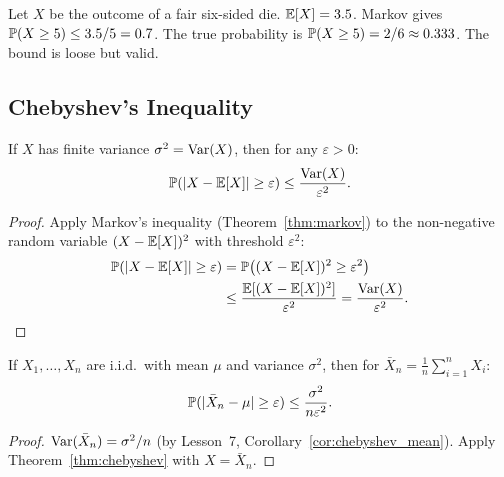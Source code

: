 \documentclass[11pt,a4paper]{article}
\begin{document}
\begin{example}
\label{ex:markov_die}
Let $X$ be the outcome of a fair six-sided die.
$\mathbb{E}[X] = 3.5$.  Markov gives
$\mathbb{P}(X \geq 5) \leq 3.5/5 = 0.7$.  The true probability is
$\mathbb{P}(X \geq 5) = 2/6 \approx 0.333$.  The bound is loose but
valid.
\end{example}

\subsection{Chebyshev's Inequality}
\label{subsec:chebyshev}

\begin{keyresult}[title={Chebyshev's Inequality}]
\begin{theorem}
\label{thm:chebyshev}
If $X$ has finite variance $\sigma^2 = \operatorname{Var}(X)$, then for any
$\varepsilon > 0$:
\begin{equation}
  \mathbb{P}(|X - \mathbb{E}[X]| \geq \varepsilon)
  \leq \frac{\operatorname{Var}(X)}{\varepsilon^2}.
  \label{eq:chebyshev}
\end{equation}
\end{theorem}
\end{keyresult}

\begin{proof}
Apply Markov's inequality (Theorem~\ref{thm:markov}) to the
non-negative random variable $(X - \mathbb{E}[X])^2$ with threshold
$\varepsilon^2$:
\begin{align}
  \mathbb{P}(|X - \mathbb{E}[X]| \geq \varepsilon)
  &= \mathbb{P}\!\left((X - \mathbb{E}[X])^2 \geq \varepsilon^2\right)
  \nonumber\\
  &\leq \frac{\mathbb{E}[(X - \mathbb{E}[X])^2]}{\varepsilon^2}
  = \frac{\operatorname{Var}(X)}{\varepsilon^2}. \qedhere
  \label{eq:chebyshev_proof}
\end{align}
\end{proof}

\begin{corollary}
\label{cor:chebyshev_mean}
If $X_1, \ldots, X_n$ are i.i.d.\ with mean $\mu$ and variance
$\sigma^2$, then for $\bar{X}_n = \frac{1}{n}\sum_{i=1}^n X_i$:
\begin{equation}
  \mathbb{P}(|\bar{X}_n - \mu| \geq \varepsilon)
  \leq \frac{\sigma^2}{n\varepsilon^2}.
  \label{eq:chebyshev_mean}
\end{equation}
\end{corollary}

\begin{proof}
$\operatorname{Var}(\bar{X}_n) = \sigma^2/n$ (by Lesson~7,
Corollary~\ref{cor:chebyshev_mean}).  Apply
Theorem~\ref{thm:chebyshev} with $X = \bar{X}_n$.
\end{proof}
\end{document}
